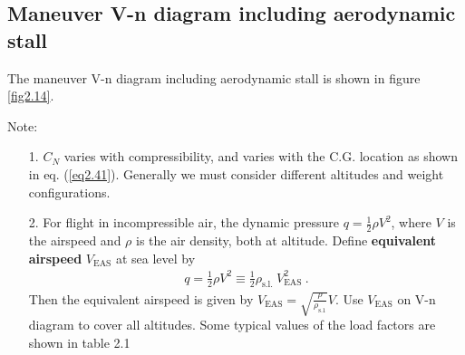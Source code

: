 \documentclass{AeroStructure-ERJohnson}
\begin{document}
\subsection{Maneuver V-n diagram including aerodynamic stall}\label{sec2.4.6}

The maneuver V-n diagram including aerodynamic stall is shown in figure \ref{fig2.14}.

{\def\thefigure{2.14}
}



\noindent Note:\vspace*{-9pt}
\begin{enumerate}
\item[1.] $C_{N}$ varies with compressibility, and varies with the C.G. location as shown in eq. (\ref{eq2.41}). Generally we must consider different altitudes and weight configurations.

\item[2.] For flight in incompressible air, the dynamic pressure $q=\frac{1}{2} \rho V^{2}$, where $V$ is the airspeed and $\rho$ is the air density, both at altitude. Define \textbf{equivalent airspeed} $V_{\mathrm{EAS}}$ at sea level by
\begin{align}\label{eq2.46}
q=\frac{1}{2} \rho V^{2} \equiv \frac{1}{2} \rho_{\text {s.l. }} V_{\text {EAS }}^{2}.
\end{align}
Then the equivalent airspeed is given by $V_{\mathrm{EAS}}=\sqrt{\frac{\rho}{\rho_{\mathrm{s}.1}}} V$. Use $V_{\mathrm{EAS}}$ on V-n diagram to cover all altitudes. Some typical values of the load factors are shown in table 2.1\end{enumerate}
\end{document}

